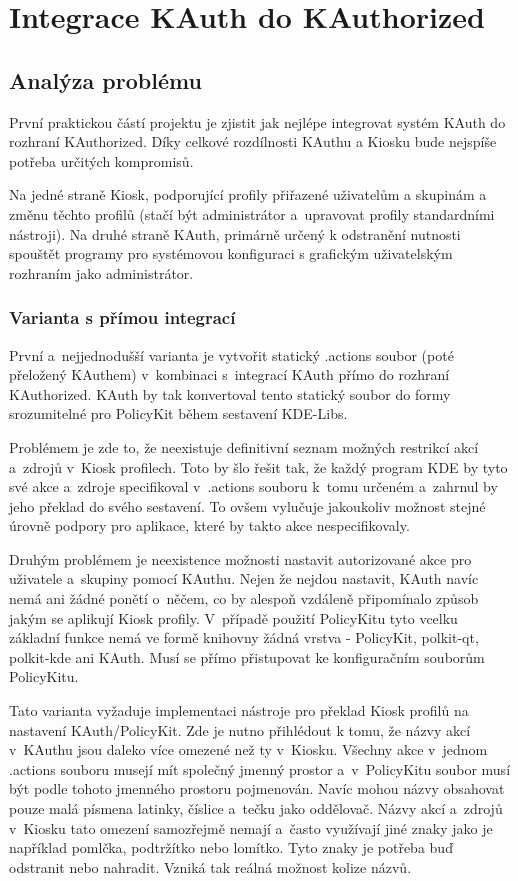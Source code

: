 \chapter{Integrace KAuth do KAuthorized}
\section{Analýza problému}
První praktickou částí projektu je zjistit jak nejlépe integrovat systém KAuth do rozhraní KAuthorized. Díky celkové rozdílnosti KAuthu a Kiosku bude nejspíše potřeba určitých kompromisů.

Na jedné straně Kiosk, podporující profily přiřazené uživatelům a skupinám a změnu těchto profilů (stačí být administrátor a~upravovat profily standardními nástroji). Na druhé straně KAuth, primárně určený k odstranění nutnosti spouštět programy pro systémovou konfiguraci s grafickým uživatelským rozhraním jako administrátor.

\subsection*{Varianta s přímou integrací}
První a~nejjednodušší varianta je vytvořit statický .actions soubor (poté přeložený KAuthem) v~kombinaci s~integrací KAuth přímo do rozhraní KAuthorized. KAuth by tak konvertoval tento statický soubor do formy srozumitelné pro PolicyKit během sestavení KDE-Libs.

Problémem je zde to, že neexistuje definitivní seznam možných restrikcí akcí a~zdrojů v~Kiosk profilech. Toto by šlo řešit tak, že každý program KDE by tyto své akce a~zdroje specifikoval v~.actions souboru k~tomu určeném a~zahrnul by jeho překlad do svého sestavení. To ovšem vylučuje jakoukoliv možnost stejné úrovně podpory pro aplikace, které by takto akce nespecifikovaly.

Druhým problémem je neexistence možnosti nastavit autorizované akce pro uživatele a~skupiny pomocí KAuthu. Nejen že nejdou nastavit, KAuth navíc nemá ani žádné ponětí o~něčem, co by alespoň vzdáleně připomínalo způsob jakým se aplikují Kiosk profily. V~případě použití PolicyKitu tyto vcelku základní funkce nemá ve formě knihovny žádná vrstva - PolicyKit, polkit-qt, polkit-kde ani KAuth. Musí se přímo přistupovat ke konfiguračním souborům PolicyKitu.

Tato varianta vyžaduje implementaci nástroje pro překlad Kiosk profilů na nastavení KAuth/PolicyKit. Zde je nutno přihlédout k tomu, že názvy akcí v~KAuthu jsou daleko více omezené než ty v~Kiosku. Všechny akce v~jednom .actions souboru musejí mít společný jmenný prostor a~v~PolicyKitu soubor musí být podle tohoto jmenného prostoru pojmenován. Navíc mohou názvy obsahovat pouze malá písmena latinky, číslice a~tečku jako oddělovač. Názvy akcí a~zdrojů v~Kiosku tato omezení samozřejmě nemají a~často využívají jiné znaky jako je například pomlčka, podtržítko nebo lomítko. Tyto znaky je potřeba buď odstranit nebo nahradit. Vzniká tak reálná možnost kolize názvů.

